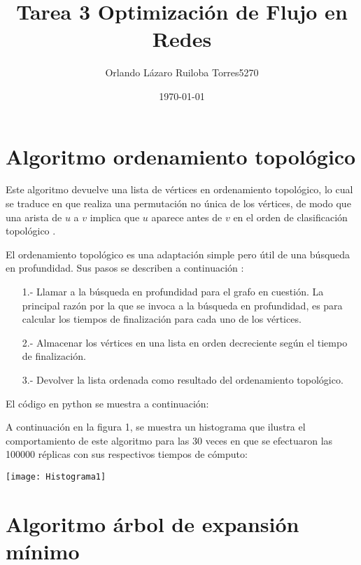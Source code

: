\documentclass[10pt,a4paper]{article}
\author{Orlando Lázaro Ruiloba Torres\hspace{.4cm}5270}
\title{Tarea 3 Optimización de Flujo en Redes}
\date{\today}
\begin{document}
\maketitle

\section{Algoritmo ordenamiento topológico}

Este algoritmo devuelve una lista de vértices en ordenamiento topológico, lo cual se traduce en que realiza una permutación no única de los vértices, de modo que una arista de $u$ a $v$ implica que $u$ aparece antes de $v$ en el orden de clasificación topológico \cite{a1}\vspace{.4cm}.

El ordenamiento topológico es una adaptación simple pero útil de una búsqueda en profundidad. Sus pasos se describen a continuación \cite{a6}:

\begin{itemize}

\item[1.-]Llamar a la búsqueda en profundidad para el grafo en cuestión. La principal razón por la que se invoca a la búsqueda en profundidad, es para calcular los tiempos de finalización para cada uno de los vértices.
\item[2.-]Almacenar los vértices en una lista en orden decreciente según el tiempo de finalización.
\item[3.-]Devolver la lista ordenada como resultado del ordenamiento topológico.

\end{itemize}

El código en python se muestra a continuación:



A continuación en la figura 1, se muestra un histograma que ilustra el comportamiento de este algoritmo para las 30 veces en que se efectuaron las 100000 réplicas con sus respectivos tiempos de cómputo:

\begin{center}

\texttt{[image: Histograma1]}

\end{center}

\section{Algoritmo árbol de expansión mínimo}
\end{document}
